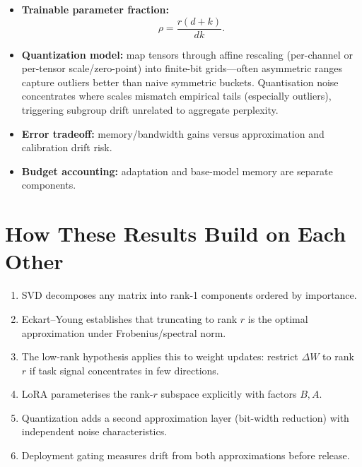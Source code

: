 \begin{itemize}[leftmargin=1.5em]
  \item \textbf{Trainable parameter fraction:}
  \[
    \rho=\frac{r(d+k)}{dk}.
  \]
  \item \textbf{Quantization model:} map tensors through affine rescaling (per-channel or per-tensor scale/zero-point) into finite-bit grids---often asymmetric ranges capture outliers better than naive symmetric buckets. Quantisation noise concentrates where scales mismatch empirical tails (especially outliers), triggering subgroup drift unrelated to aggregate perplexity.
  \item \textbf{Error tradeoff:} memory/bandwidth gains versus approximation and calibration drift risk.
  \item \textbf{Budget accounting:} adaptation and base-model memory are separate components.
\end{itemize}

\section*{How These Results Build on Each Other}
\begin{enumerate}[leftmargin=1.5em]
  \item SVD decomposes any matrix into rank-1 components ordered by importance.
  \item Eckart--Young establishes that truncating to rank $r$ is the optimal approximation under Frobenius/spectral norm.
  \item The low-rank hypothesis applies this to weight updates: restrict $\Delta W$ to rank $r$ if task signal concentrates in few directions.
  \item LoRA parameterises the rank-$r$ subspace explicitly with factors $B, A$.
  \item Quantization adds a second approximation layer (bit-width reduction) with independent noise characteristics.
  \item Deployment gating measures drift from both approximations before release.
\end{enumerate}

